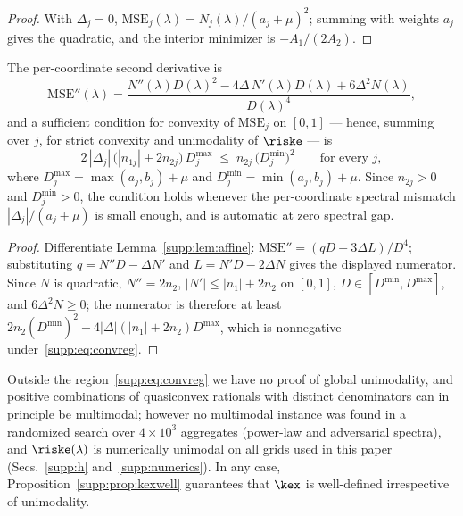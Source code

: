 \begin{proof}
With $\Delta_j = 0$, $\mathrm{MSE}_j(\lambda) = N_j(\lambda)/(a_j+\mu)^2$; summing with weights $a_j$ gives the quadratic, and the interior minimizer is $-A_1/(2A_2)$.
\end{proof}

\begin{proposition}\label{supp:prop:convreg}
The per-coordinate second derivative is
\begin{equation}
\mathrm{MSE}''(\lambda) = \frac{N''(\lambda)D(\lambda)^2 - 4\Delta\, N'(\lambda)D(\lambda) + 6\Delta^2 N(\lambda)}{D(\lambda)^4},
\end{equation}
and a sufficient condition for convexity of $\mathrm{MSE}_j$ on $[0,1]$ --- hence, summing over $j$, for strict convexity and unimodality of $\riske$ --- is
\begin{equation}
2\,|\Delta_j|\,\big(|n_{1j}| + 2 n_{2j}\big)\,D_j^{\max} \;\le\; n_{2j}\,\big(D_j^{\min}\big)^2
\qquad\text{for every } j,
\label{supp:eq:convreg}
\end{equation}
where $D_j^{\max} = \max(a_j, b_j) + \mu$ and $D_j^{\min} = \min(a_j, b_j) + \mu$.
Since $n_{2j} > 0$ and $D_j^{\min} > 0$, the condition holds whenever the per-coordinate spectral mismatch $|\Delta_j|/(a_j + \mu)$ is small enough, and is automatic at zero spectral gap.
\end{proposition}

\begin{proof}
Differentiate Lemma~\ref{supp:lem:affine}: $\mathrm{MSE}'' = (qD - 3\Delta L)/D^4$; substituting $q = N''D - \Delta N'$ and $L = N'D - 2\Delta N$ gives the displayed numerator.
Since $N$ is quadratic, $N'' = 2n_2$, $|N'| \le |n_1| + 2n_2$ on $[0,1]$, $D \in [D^{\min}, D^{\max}]$, and $6\Delta^2 N \ge 0$; the numerator is therefore at least $2 n_2 (D^{\min})^2 - 4|\Delta|(|n_1| + 2n_2) D^{\max}$, which is nonnegative under~\eqref{supp:eq:convreg}.
\end{proof}

Outside the region~\eqref{supp:eq:convreg} we have no proof of global unimodality, and positive combinations of quasiconvex rationals with distinct denominators can in principle be multimodal; however no multimodal instance was found in a randomized search over $4\times10^3$ aggregates (power-law and adversarial spectra), and $\riske(\lambda)$ is numerically unimodal on all grids used in this paper (Secs.~\ref{supp:h} and~\ref{supp:numerics}).
In any case, Proposition~\ref{supp:prop:kexwell} guarantees that $\kex$ is well-defined irrespective of unimodality.

